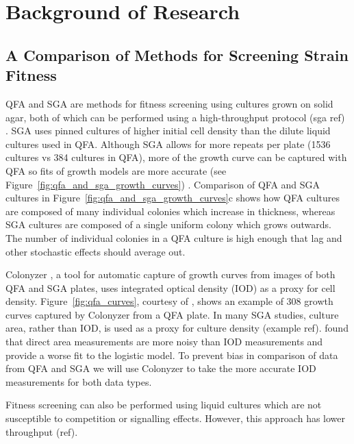 \graphicspath{{images_low_res/}}

\section{Background of Research}
\label{sec:background}

\subsection{A Comparison of Methods for Screening Strain Fitness }

QFA and SGA are methods for fitness screening using cultures grown on solid agar, both of
which can be performed using a high-throughput protocol (sga ref) \cite{Banks2012}. SGA
uses pinned cultures of higher initial cell density than the dilute liquid cultures used
in QFA. Although SGA allows for more repeats per plate (1536 cultures vs 384 cultures in
QFA), more of the growth curve can be captured with QFA so fits of growth models are more
accurate (see Figure~\ref{fig:qfa_and_sga_growth_curves}) \citep{Lawless2010}.
Comparison of QFA and SGA cultures in Figure~\ref{fig:qfa_and_sga_growth_curves}c shows
how QFA cultures are composed of many individual colonies which increase in thickness,
whereas SGA cultures are composed of a single uniform colony which grows outwards. The
number of individual colonies in a QFA culture is high enough that lag and other
stochastic effects should average out.

Colonyzer \citep{Lawless2010}, a tool for automatic capture of growth curves from images
of both QFA and SGA plates, uses integrated optical density (IOD) as a proxy for cell
density. Figure~\ref{fig:qfa_curves}, courtesy of \citet{Banks2012}, shows an example of
308 growth curves captured by Colonyzer from a QFA plate. In many SGA studies, culture
area, rather than IOD, is used as a proxy for culture density (example
ref). \cite{Lawless2010} found that direct area measurements are more noisy than IOD
measurements and provide a worse fit to the logistic model. To prevent bias in comparison
of data from QFA and SGA we will use Colonyzer to take the more accurate IOD measurements
for both data types.

Fitness screening can also be performed using liquid cultures which are not susceptible to
competition or signalling effects. However, this approach has lower throughput (ref).

